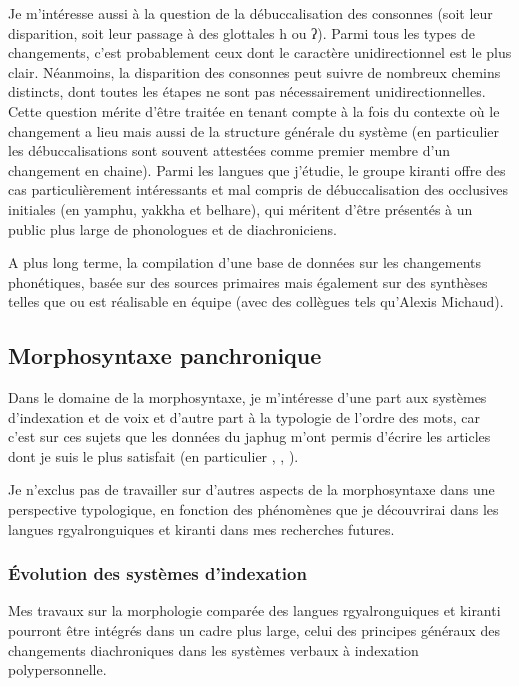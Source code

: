 \documentclass[oldfontcommands,oneside,a4paper,11pt]{article}
\newcommand{\ipa}[1]{{\phon #1}} %
\begin{document}
Je m'intéresse aussi à la question de la débuccalisation des consonnes (soit leur disparition, soit leur passage à des glottales \ipa{h} ou \ipa{ʔ}). Parmi tous les types de changements, c'est probablement ceux dont le caractère unidirectionnel est le plus clair. Néanmoins, la disparition des consonnes peut suivre de nombreux chemins distincts, dont toutes les étapes ne sont pas nécessairement unidirectionnelles. Cette question mérite d'être traitée en tenant compte à la fois du contexte où le changement a lieu mais aussi de la structure générale du système (en particulier les débuccalisations sont souvent attestées comme premier membre d'un changement en chaine). Parmi les langues que j'étudie, le groupe kiranti offre des cas particulièrement intéressants et mal compris de débuccalisation des occlusives initiales (en yamphu, yakkha et belhare), qui méritent d'être présentés à un public plus large de phonologues et de diachroniciens.


A plus long terme, la compilation d'une base de données sur les changements phonétiques, basée sur des sources primaires mais également sur des synthèses telles que  \citet{kuemmel07wandel} ou \citet{blevins04evolutionary, blevins08naturalness} est réalisable en équipe (avec des collègues tels qu'Alexis Michaud).

 

\subsection{Morphosyntaxe panchronique} \label{sec:morphosyntaxe}
Dans le domaine de la morphosyntaxe, je m'intéresse d'une part aux systèmes d'indexation et de voix et d'autre part à la typologie de l'ordre des mots, car c'est sur ces sujets que les données du japhug m'ont permis d'écrire les articles dont je suis le plus satisfait (en particulier \citealt{jacques12incorp}, \citealt{jacques13harmonization}, \citealt{jacques14antipassive}).

Je n'exclus pas de travailler sur d'autres aspects de la morphosyntaxe dans une perspective typologique, en fonction des phénomènes que je découvrirai  dans les langues rgyalronguiques et kiranti dans mes recherches futures.

\subsubsection{Évolution des systèmes d'indexation} \label{sec:indexation}
 Mes travaux sur la morphologie comparée des langues rgyalronguiques et kiranti pourront être intégrés dans un cadre plus large, celui des principes généraux des changements diachroniques dans les systèmes verbaux à indexation polypersonnelle.  
 
\end{document}

